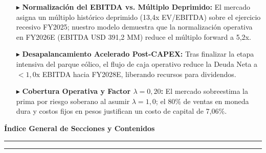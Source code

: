 \documentclass[10pt,a4paper]{article}
\begin{document}
\vspace{0.15cm}
\noindent
\begin{tcolorbox}[colback=white, colframe=gsblue!40, boxrule=0.5pt, top=2pt, bottom=2pt, left=4pt, right=4pt, title={\small\sffamily \textbf{Divergencias Clave frente a las Expectativas de Mercado (Tesis de Diferenciación)}}, coltitle=gsnavy]
    \footnotesize
    \begin{itemize}
        \setlength{\itemsep}{0pt}
        \item[\color{aluargreen}$\blacktriangleright$] \textbf{Normalización del EBITDA vs. Múltiplo Deprimido:} El mercado asigna un múltiplo histórico deprimido (13,4x EV/EBITDA) sobre el ejercicio recesivo FY2025; nuestro modelo demuestra que la normalización operativa en FY2026E (EBITDA USD 391,2 MM) reduce el múltiplo forward a 5,2x.
        \item[\color{aluargreen}$\blacktriangleright$] \textbf{Desapalancamiento Acelerado Post-CAPEX:} Tras finalizar la etapa intensiva del parque eólico, el flujo de caja operativo reduce la Deuda Neta a $<1,0\text{x}$ EBITDA hacia FY2028E, liberando recursos para dividendos.
        \item[\color{aluargreen}$\blacktriangleright$] \textbf{Cobertura Operativa y Factor $\lambda = 0,20$:} El mercado sobreestima la prima por riesgo soberano al asumir $\lambda=1,0$; el 80\% de ventas en moneda dura y costos fijos en pesos justifican un costo de capital de 7,06\%.
    \end{itemize}
\end{tcolorbox}

\clearpage


\begin{center}
    {\large\georgiahead\bfseries\color{gsnavy} Índice General de Secciones y Contenidos}
\end{center}
\vspace{-0.2cm}
\hrule height 0.8pt
\vspace{0.2cm}

\begin{multicols}{2}
\small
\makeatletter
{}
\makeatother
\end{multicols}

\vspace{0.2cm}
\hrule height 0.4pt
\vspace{0.15cm}
\end{document}

